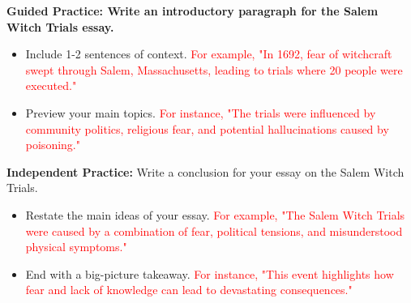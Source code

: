 \documentclass[12pt]{article}
\begin{document}
\vspace{1em}

\begin{tcolorbox}[colframe=black!60, colback=white, 
coltitle=black, colbacktitle=black!15, fonttitle=\bfseries\Large, 
title=Guided Practice, halign title=center, left=10pt, right=10pt, top=10pt, bottom=15pt]
\textbf{Guided Practice: Write an introductory paragraph for the Salem Witch Trials essay.}
\begin{itemize}
    \item Include 1-2 sentences of context. \textcolor{red}{For example, "In 1692, fear of witchcraft swept through Salem, Massachusetts, leading to trials where 20 people were executed."}
    \item Preview your main topics. \textcolor{red}{For instance, "The trials were influenced by community politics, religious fear, and potential hallucinations caused by poisoning."}
\end{itemize}
\vspace{2cm}
\end{tcolorbox}

\begin{tcolorbox}[colframe=black!60, colback=white, 
coltitle=black, colbacktitle=black!15, fonttitle=\bfseries\Large, 
title=Independent Practice, halign title=center, left=10pt, right=10pt, top=10pt, bottom=15pt]
\textbf{Independent Practice:} Write a conclusion for your essay on the Salem Witch Trials.
\begin{itemize}
    \item Restate the main ideas of your essay. \textcolor{red}{For example, "The Salem Witch Trials were caused by a combination of fear, political tensions, and misunderstood physical symptoms."}
    \item End with a big-picture takeaway. \textcolor{red}{For instance, "This event highlights how fear and lack of knowledge can lead to devastating consequences."}
\end{itemize}
\vspace{4cm}
\end{tcolorbox}
\end{document}
